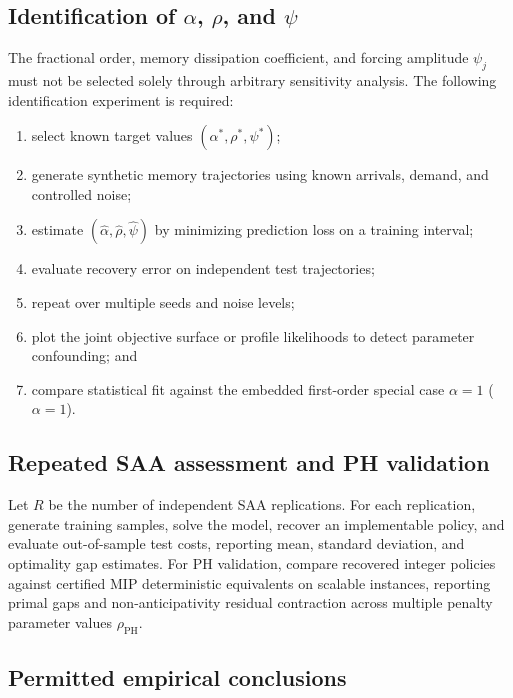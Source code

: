 \documentclass[11pt,a4paper]{article}
\begin{document}
\subsection{Identification of \texorpdfstring{\(\alpha\)}{alpha},
\texorpdfstring{\(\rho\)}{rho}, and \texorpdfstring{\(\psi\)}{psi}}

The fractional order, memory dissipation coefficient, and forcing
amplitude \(\psi_j\) must not be
selected solely through arbitrary sensitivity analysis. The following
identification experiment is required:
\begin{enumerate}
  \item select known target values \((\alpha^{*},\rho^{*},\psi^{*})\);
  \item generate synthetic memory trajectories using known arrivals,
  demand, and controlled noise;
  \item estimate \((\widehat\alpha,\widehat\rho,\widehat\psi)\) by minimizing prediction loss on a
  training interval;
  \item evaluate recovery error on independent test trajectories;
  \item repeat over multiple seeds and noise levels;
  \item plot the joint objective surface or profile likelihoods to detect
  parameter confounding; and
  \item compare statistical fit against the embedded first-order special case $\alpha=1$
  (\(\alpha=1\)).
\end{enumerate}

\subsection{Repeated SAA assessment and PH validation}

Let \(R\) be the number of independent SAA replications. For each
replication, generate training samples, solve the model, recover an
implementable policy, and evaluate out-of-sample test costs, reporting
mean, standard deviation, and optimality gap estimates. For PH
validation, compare recovered integer policies against certified MIP
deterministic equivalents on scalable instances, reporting primal gaps
and non-anticipativity residual contraction across multiple penalty
parameter values \(\rho_{\mathrm{PH}}\).

\subsection{Permitted empirical conclusions}
\end{document}
